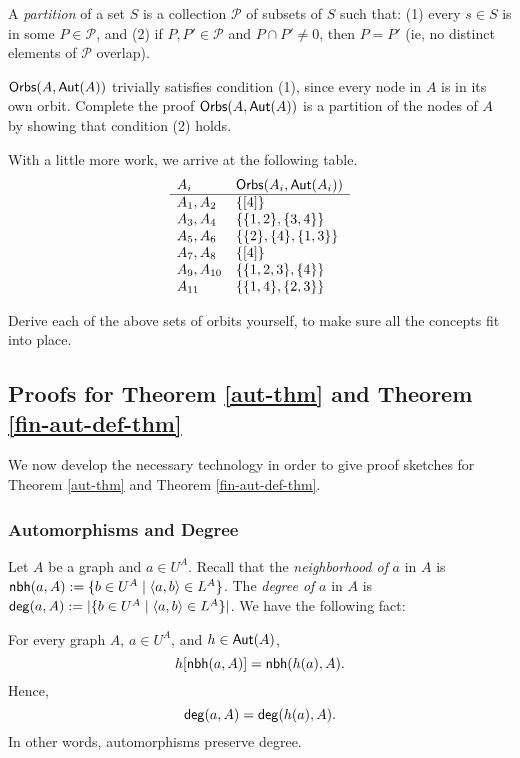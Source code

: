 \begin{aside}
A \emph{partition} of a set $S$ is a collection $\mathcal{P}$ of subsets of $S$ such that: (1) every $s \in S$ is in some $P \in \mathcal{P}$, and (2) if $P, P' \in \mathcal{P}$ and $P \cap P' \neq 0$, then $P = P'$ (ie, no distinct elements of $\mathcal{P}$ overlap).

$\mbox{$\mathsf{Orbs}(A,\mbox{$\mathsf{Aut}(A)$})$}$ trivially satisfies condition (1), since every node in $A$ is in its own orbit. Complete the proof $\mbox{$\mathsf{Orbs}(A,\mbox{$\mathsf{Aut}(A)$})$}$ is a partition of the nodes of $A$ by showing that condition (2) holds. 
\end{aside}  

With a little more work, we arrive at the following table. 
\[
\begin{array}{l l}
A_i & \mbox{$\mathsf{Orbs}(A_i,\mbox{$\mathsf{Aut}(A_i)$})$}\\
\hline
A_1, A_2 & \{[4]\}\\
A_3, A_4 & \{\{1,2\},\{3,4\}\}\\
A_5, A_6 & \{\{2\},\{4\},\{1,3\}\}\\
A_7, A_8 & \{[4]\}\\
A_9, A_{10} & \{\{1,2,3\},\{4\}\}\\
A_{11} & \{\{1,4\},\{2,3\}\}
\end{array}
\]

\begin{aside}
    Derive each of the above sets of orbits yourself, to make sure all the concepts fit into place. 
\end{aside}

\subsection*{Proofs for Theorem \ref{aut-thm} and Theorem \ref{fin-aut-def-thm}}
We now develop the necessary technology in order to give proof sketches for Theorem \ref{aut-thm} and Theorem \ref{fin-aut-def-thm}.  

\subsubsection*{Automorphisms and Degree}
Let $A$ be a graph and $a\in U^A$. Recall that the \emph{neighborhood of} $a$ in $A$ is $\mbox{$\mathsf{nbh}(a,A)$} := \{b\in U^A\mid\mbox{$\langle a,b \rangle$}\in L^A\}$. The \emph{degree of} $a$ in $A$ is $\mbox{$\mathsf{deg}(a,A)$} := \mbox{$|\{b\in U^A\mid\mbox{$\langle a,b \rangle$}\in L^A\}|$}$. We have the following fact:
\begin{proposition}
For every graph $A$, $a\in U^A$, and $h\in\mbox{$\mathsf{Aut}(A)$}$,
\[
h[\mbox{$\mathsf{nbh}(a,A)$}]=\mbox{$\mathsf{nbh}(h(a),A)$}.
\]
Hence,
\[
\mbox{$\mathsf{deg}(a,A)$} = \mbox{$\mathsf{deg}(h(a),A)$}. 
\]
In other words, automorphisms preserve degree. 
\end{proposition}

